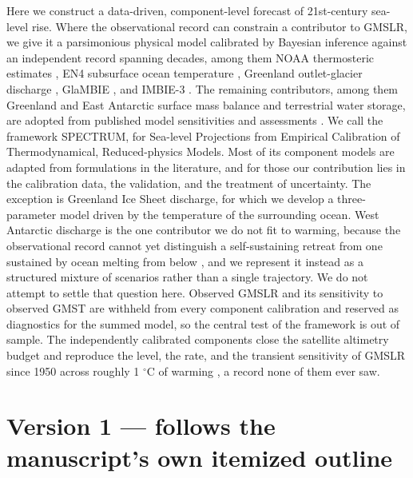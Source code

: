 \documentclass[12pt]{article}
\begin{document}
Here we construct a data-driven, component-level forecast of 21st-century sea-level
rise. Where the observational record can constrain a contributor to GMSLR, we give it a
parsimonious physical model calibrated by Bayesian inference against an independent
record spanning decades, among them NOAA thermosteric estimates
\citep{Levitus2012}, EN4 subsurface ocean temperature \citep{Good2013}, Greenland
outlet-glacier discharge \citep{Mouginot2019}, GlaMBIE \citep{GlaMBIE2025}, and IMBIE-3
\citep{Otosaka2026}. The remaining contributors, among them Greenland and East Antarctic
surface mass balance and terrestrial water storage, are adopted from published model
sensitivities and assessments \citep{Fettweis2020,Noel2021,Frieler2015,Frederikse2020}.
We call the framework SPECTRUM, for Sea-level Projections from Empirical Calibration of
Thermodynamical, Reduced-physics Models. Most of its component models are adapted from
formulations in the literature, and for those our contribution lies in the calibration
data, the validation, and the treatment of uncertainty. The exception is Greenland Ice
Sheet discharge, for which we develop a three-parameter model driven by the temperature
of the surrounding ocean. West Antarctic discharge is the one contributor we do not fit
to warming, because the observational record cannot yet distinguish a self-sustaining
retreat from one sustained by ocean melting from below
\citep{Sergienko2026,Hill2023,Reese2023}, and we represent it instead as a structured
mixture of scenarios rather than a single trajectory. We do not attempt to settle that
question here. Observed GMSLR and its sensitivity to observed GMST are withheld from
every component calibration and reserved as diagnostics for the summed model, so the
central test of the framework is out of sample. The independently calibrated components
close the satellite altimetry budget \citep{Beckley2017,Hamlington2020} and reproduce the
level, the rate, and the transient sensitivity of GMSLR since 1950 across roughly
1 $^\circ$C of warming \citep{Frederikse2020,Fox-Kemper2021}, a record none of them ever
saw.

\section*{Version 1 --- follows the manuscript's own itemized outline}
\end{document}
